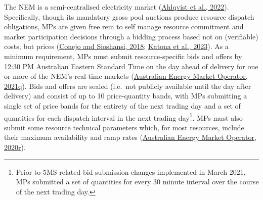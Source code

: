 \documentclass[12pt,a4paper,]{report}
\begin{document}
The NEM is a semi-centralised electricity market
(\protect\hyperlink{ref-ahlqvistSurveyComparingCentralized2022}{Ahlqvist
et al., 2022}). Specifically, though its mandatory gross pool auctions
produce resource dispatch obligations, MPs are given free rein to self
manage resource commitment and market participation decisions through a
bidding process based not on (verifiable) costs, but prices
(\protect\hyperlink{ref-conejoRethinkingRestructuredElectricity2018}{Conejo
and Sioshansi, 2018};
\protect\hyperlink{ref-katonaPriceMechanismSurvey2023}{Katona et al.,
2023}). As a minimum requirement, MPs must submit resource-specific bids
and offers by 12:30 PM Australian Eastern Standard Time on the day ahead
of delivery for one or more of the NEM's real-time markets
(\protect\hyperlink{ref-australianenergymarketoperatorSpotMarketOperations2021}{Australian
Energy Market Operator, 2021q}). Bids and offers are sealed (i.e.~not
publicly available until the day after delivery) and consist of up to 10
price-quantity bands, with MPs submitting a single set of price bands
for the entirety of the next trading day and a set of quantities for
each dispatch interval in the next trading day\footnote{Prior to
  5MS-related bid submission changes implemented in March 2021, MPs
  submitted a set of quantities for every 30 minute interval over the
  course of the next trading day.}. MPs must also submit some resource
technical parameters which, for most resources, include their maximum
availability and ramp rates
(\protect\hyperlink{ref-australianenergymarketoperatorFormatValidationEnergy2020}{Australian
Energy Market Operator, 2020r}).
\end{document}
